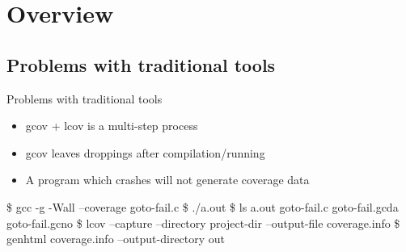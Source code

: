 \documentclass{beamer}
\begin{document}
\section{Overview}
\subsection{Problems with traditional tools}
\begin{frame}[fragile]{Problems with traditional tools}
  \begin{itemize}
  \item gcov + lcov is a multi-step process
  \item gcov leaves droppings after compilation/running
  \item A program which crashes will not generate coverage data
  \end{itemize}
  \begin{Example}
    \begin{semiverbatim}
     \scriptsize
\$ gcc -g -Wall --coverage goto-fail.c
\$ ./a.out
\$ ls
  a.out  goto-fail.c  goto-fail.gcda  goto-fail.gcno
\$ lcov --capture --directory project-dir --output-file coverage.info
\$ genhtml coverage.info --output-directory out
    \end{semiverbatim}
  \end{Example}
\end{frame}
\end{document}
